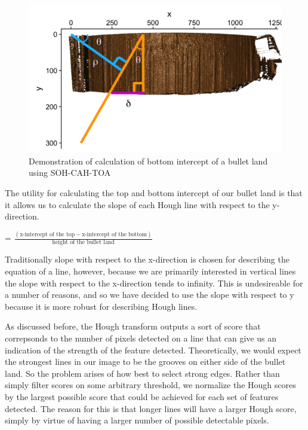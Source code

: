 \documentclass[12pt]{article}
\theoremstyle{nonumberplain}
\begin{document}
\begin{figure}[ht!]
  \centering
  \includegraphics{../images/calc-xbottom.png}
  \caption{Demonstration of calculation of bottom intercept of a bullet land using SOH-CAH-TOA}
  \label{fig: calcxbottom}
\end{figure}

The utility for calculating the top and bottom intercept of our bullet land is that it allows us to calculate the slope of each Hough line with respect to the y-direction. 
\begin{center}
 = $\frac{(\text{x-intercept of the top} - \text{x-intercept of the bottom})}{\text{height of the bullet land}}$
\end{center}

Traditionally slope with respect to the x-direction is chosen for describing the equation of a line, however, because we are primarily interested in vertical lines the slope with respect to the x-direction tends to infinity. This is undesireable for a number of reasons, and so we have decided to use the slope with respect to y because it is more robust for describing Hough lines. 

As discussed before, the Hough transform outputs a sort of score that correpsonds to the number of pixels detected on a line that can give us an indication of the strength of the feature detected. Theoretically, we would expect the strongest lines in our image to be the grooves on either side of the bullet land. So the problem arises of how best to select strong edges. Rather than simply filter scores on some arbitrary threshold, we normalize the Hough scores by the largest possible score that could be achieved for each set of features detected. The reason for this is that longer lines will have a larger Hough score, simply by virtue of having a larger number of possible detectable pixels.  
\end{document}
